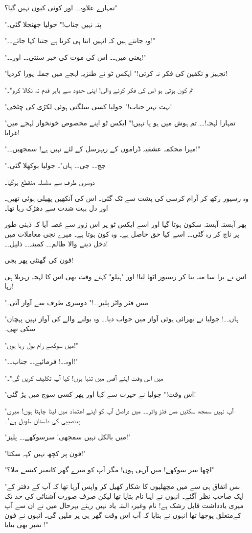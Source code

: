 تمہارے علاوہ۔۔ اور کوئی کیوں نہیں گیا؟"

"پتہ نہیں جناب!" جولیا جھنجلا گئی۔

"وہ جانتے ہیں کہ انہیں اتنا ہی کرنا ہے جتنا کہا جائے۔۔!"

"یعنی میں۔۔ اس کی موت کی خبر سنتی۔۔ اور۔۔!"

"تجہیز و تکفین کی فکر نہ کرتی!" ایکس ٹو نے طنزیہ لہجے میں جملہ پورا کردیا!

"تم کون ہوتی ہو اس کی فکر کرنے والی! اپنی حدود سے باہر قدم نہ نکالا کرو"۔

"بہت بہتر جناب!" جولیا کسی سلگتی ہوئی لکڑی کی چٹخی!

"تمہارا لہجہ!۔۔ تم ہوش میں ہو یا نہیں!" ایکس ٹو اپنے مخصوص خونخوار لہجے میں غرایا!

"میرا محکمہ عشقیہ ڈراموں کے ریہرسل کے لئے نہیں ہے! سمجھیں۔۔!"

"جج۔۔ جی۔۔ ہاں"۔ جولیا بوکھلا گئی۔

دوسری طرف سے سلسلہ منقطع ہوگیا۔

وہ رسیور رکھ کر آرام کرسی کی پشت سے ٹک گئی۔ اس کی آنکھیں پھیلی ہوئی تھیں۔ اور دل بہت شدت سے دھڑک رہا تھا۔

پھر آہستہ آہستہ سکون ہوتا گیا اور اسے ایکس ٹو پر اس زور سے غصہ آیا کہ ذہنی طور پر ناچ کر رہ گئی۔۔ اسے کیا حق حاصل ہے۔ وہ کون ہوتا ہے۔ میرے نجی معاملات میں دخل دینے والا ظالم۔۔ کمینہ۔۔ ذلیل۔۔!

فون کی گھنٹی پھر بجی!

اس نے برا سا منہ بنا کر رسیور اٹھا لیا! اور "ہیلو" کہتے وقت بھی اس کا لہجہ زہریلا ہی رہا!

"مس فٹز واٹر پلیز۔۔!" دوسری طرف سے آواز آئی۔

"ہاں۔۔! جولیا نے بھرائی ہوئی آواز میں جواب دیا۔۔ وہ بولنے والے کی آواز نہیں پہچان سکی تھی۔

"میں سوکھے رام بول رہا ہوں!"

"اوہ۔۔! فرمائیے۔۔ جناب۔۔!"

"میں اس وقت اپنے آفس میں تنہا ہوں! کیا آپ تکلیف کریں گی"۔

"اس وقت!" جولیا نے حیرت سے کہا اور پھر کسی سوچ میں پڑ گئی!

"آپ نہیں سمجھ سکتیں مس فٹز واٹر۔۔ میں دراصل آپ کو اپنے اعتماد میں لینا چاہتا ہوں! میری بدنصیبی کی داستان طویل ہے"۔

"میں بالکل نہیں سمجھی! سرسوکھے۔۔ پلیز!"

"فون پر کچھ نہیں کہہ سکتا!"

"اچھا سر سوکھے! میں آرہی ہوں! مگر آپ کو میرے گھر کانمبر کیسے ملا؟"

"بس اتفاق ہی سے میں مچھلیوں کا شکار کھیل کر واپس آرہا تھا کہ آپ کے دفتر کے ایک صاحب نظر آگئے۔ انہوں نے اپنا نام بتایا تھا لیکن صرف صورت آشنائی کی حد تک میری یادداشت قابل رشک ہے! نام وغیرہ البتہ یاد نہیں رہتے بہرحال میں نے ان سے آپ کےمتعلق پوچھا تھا انہوں نے بتایا کہ آپ اس وقت گھر ہی پر ملیں گی۔ انہوں نے فون نمبر بھی بتایا !"

